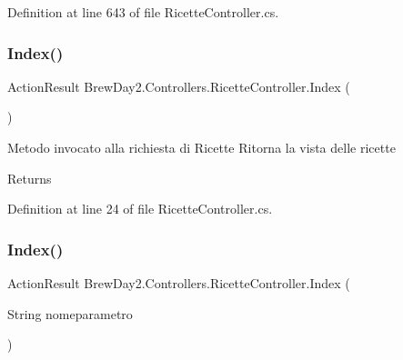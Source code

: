 Definition at line 643 of file Ricette\+Controller.\+cs.

\mbox{\label{class_brew_day2_1_1_controllers_1_1_ricette_controller_af44eaada103e9c50fca11811298d8bc8}} 
\subsubsection{\texorpdfstring{Index()}{Index()}\hspace{0.1cm}{\footnotesize\ttfamily [1/2]}}
{\footnotesize\ttfamily Action\+Result Brew\+Day2.\+Controllers.\+Ricette\+Controller.\+Index (\begin{DoxyParamCaption}{ }\end{DoxyParamCaption})}



Metodo invocato alla richiesta di Ricette Ritorna la vista delle ricette 

\begin{DoxyReturn}{Returns}

\end{DoxyReturn}


Definition at line 24 of file Ricette\+Controller.\+cs.

\mbox{\label{class_brew_day2_1_1_controllers_1_1_ricette_controller_aea9a165c737ac4b7e272284161296968}} 
\subsubsection{\texorpdfstring{Index()}{Index()}\hspace{0.1cm}{\footnotesize\ttfamily [2/2]}}
{\footnotesize\ttfamily Action\+Result Brew\+Day2.\+Controllers.\+Ricette\+Controller.\+Index (\begin{DoxyParamCaption}\item[{String}]{nomeparametro }\end{DoxyParamCaption})}



